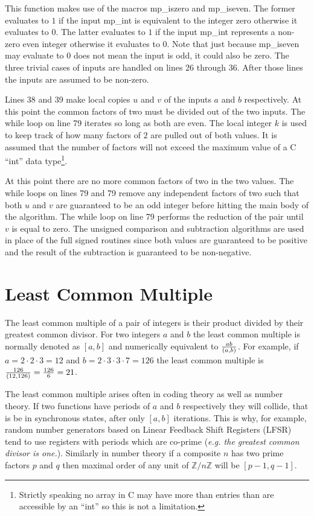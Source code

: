 \documentclass[b5paper]{book}
\def\Z{{\mathbb Z}}
\begin{document}
This function makes use of the macros mp\_iszero and mp\_iseven.  The former evaluates to $1$ if the input mp\_int is equivalent to the 
integer zero otherwise it evaluates to $0$.  The latter evaluates to $1$ if the input mp\_int represents a non-zero even integer otherwise
it evaluates to $0$.  Note that just because mp\_iseven may evaluate to $0$ does not mean the input is odd, it could also be zero.  The three 
trivial cases of inputs are handled on lines 26 through 36.  After those lines the inputs are assumed to be non-zero.

Lines 38 and 39 make local copies $u$ and $v$ of the inputs $a$ and $b$ respectively.  At this point the common factors of two 
must be divided out of the two inputs.  The while loop on line 79 iterates so long as both are even.  The local integer $k$ is used to
keep track of how many factors of $2$ are pulled out of both values.  It is assumed that the number of factors will not exceed the maximum 
value of a C ``int'' data type\footnote{Strictly speaking no array in C may have more than entries than are accessible by an ``int'' so this is not 
a limitation.}.  

At this point there are no more common factors of two in the two values.  The while loops on lines 79 and 79 remove any independent
factors of two such that both $u$ and $v$ are guaranteed to be an odd integer before hitting the main body of the algorithm.  The while loop
on line 79 performs the reduction of the pair until $v$ is equal to zero.  The unsigned comparison and subtraction algorithms are used in
place of the full signed routines since both values are guaranteed to be positive and the result of the subtraction is guaranteed to be non-negative.

\section{Least Common Multiple}
The least common multiple of a pair of integers is their product divided by their greatest common divisor.  For two integers $a$ and $b$ the
least common multiple is normally denoted as $[ a, b ]$ and numerically equivalent to ${ab} \over {(a, b)}$.  For example, if $a = 2 \cdot 2 \cdot 3 = 12$
and $b = 2 \cdot 3 \cdot 3 \cdot 7 = 126$ the least common multiple is ${126 \over {(12, 126)}} = {126 \over 6} = 21$.

The least common multiple arises often in coding theory as well as number theory.  If two functions have periods of $a$ and $b$ respectively they will
collide, that is be in synchronous states, after only $[ a, b ]$ iterations.  This is why, for example, random number generators based on 
Linear Feedback Shift Registers (LFSR) tend to use registers with periods which are co-prime (\textit{e.g. the greatest common divisor is one.}).  
Similarly in number theory if a composite $n$ has two prime factors $p$ and $q$ then maximal order of any unit of $\Z/n\Z$ will be $[ p - 1, q - 1] $.
\end{document}
